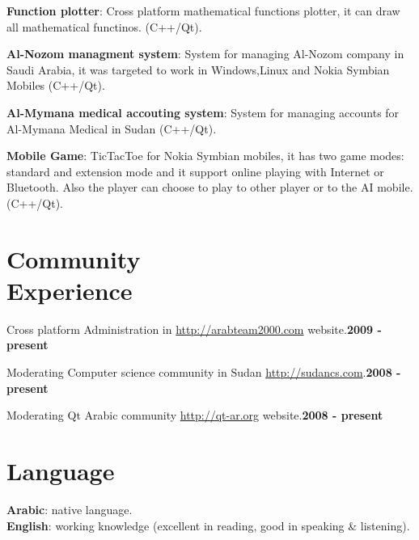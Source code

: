 \documentclass[margin,line,a4paper]{resume}
\begin{document}
\begin{resume}
\textbf{Function plotter}: Cross platform mathematical functions plotter, it can draw all mathematical functinos. (C++/Qt).
\vspace{-2mm}

\textbf{Al-Nozom managment system}: System for managing Al-Nozom company in Saudi Arabia, it was targeted to work in Windows,Linux and Nokia Symbian Mobiles (C++/Qt).
\vspace{-2mm}

\textbf{Al-Mymana medical accouting system}: System for managing accounts for Al-Mymana Medical in Sudan (C++/Qt).
\vspace{-2mm}

\textbf{Mobile Game}: TicTacToe for Nokia Symbian mobiles, it has two game modes: standard and extension mode and it support online playing with Internet or Bluetooth. Also the player can choose to play to other player or to the AI mobile.(C++/Qt).\\
\vspace{-2mm}




\section{\mysidestyle  Community\\Experience} 
Cross platform Administration in \url{http://arabteam2000.com} website.\hfill \textbf{2009 - present}\vspace{-2mm}

Moderating Computer science community in Sudan \url{http://sudancs.com}.\hfill \textbf{2008 - present}\vspace{-2mm}

Moderating Qt Arabic community \url{http://qt-ar.org} website.\hfill \textbf{2008 - present}\vspace{-3mm}\\\vspace{3mm}

\section{\mysidestyle Language}
	\textbf{Arabic}:   native language.\\
	\textbf{English}: working knowledge (excellent in reading, good in speaking \& listening).\\


\end{resume}
\end{document}
